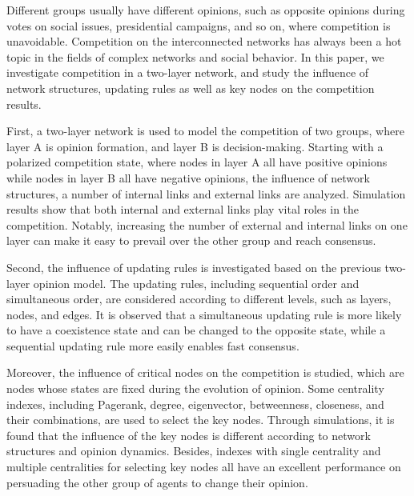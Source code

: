 
\begin{bigabstract}
	
Different groups usually have different opinions, such as opposite opinions during votes on social issues, presidential campaigns, and so on, where competition is unavoidable. Competition on the interconnected networks has always been a hot topic in the fields of complex networks and social behavior.  In this paper, we investigate competition in a two-layer network, and study the influence of network structures, updating rules as well as key nodes on the competition results.

First, a two-layer network is used to model the competition of two groups, where layer A is opinion formation, and layer B is decision-making. Starting with a polarized competition state, where nodes in layer A all have positive opinions while nodes in layer B all have negative opinions, the influence of network structures, a number of internal links and external links are analyzed.  Simulation results show that both internal and external links play vital roles in the competition. Notably, increasing the number of external and internal links on one layer can make it easy to prevail over the other group and reach consensus.

Second, the influence of updating rules is investigated based on the previous two-layer opinion model. The updating rules, including sequential order and simultaneous order, are considered according to different levels, such as layers, nodes, and edges. It is observed that a simultaneous updating rule is more likely to have a coexistence state and can be changed to the opposite state, while a sequential updating rule more easily enables fast consensus.

Moreover, the influence of critical nodes on the competition is studied, which are nodes whose states are fixed during the evolution of opinion. Some centrality indexes, including Pagerank, degree, eigenvector, betweenness, closeness, and their combinations, are used to select the key nodes. Through simulations, it is found that the influence of the key nodes is different according to network structures and opinion dynamics. Besides, indexes with single centrality and multiple centralities for selecting key nodes all have an excellent performance on persuading the other group of agents to change their opinion.\\ \\ 

\end{bigabstract}